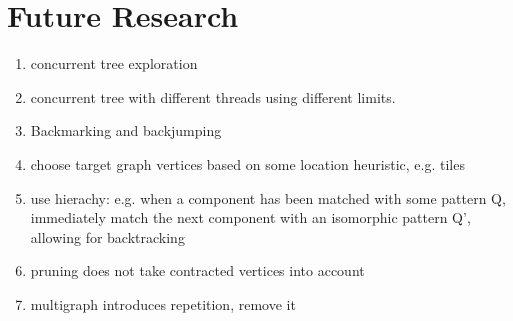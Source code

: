 \chapter{Future Research}

\begin{enumerate}
\item concurrent tree exploration
\item concurrent tree with different threads using different limits.
\item Backmarking and backjumping
\item choose target graph vertices based on some location heuristic, e.g. tiles
\item use hierachy: e.g. when a component has been matched with some pattern Q, immediately match the next component with an isomorphic pattern Q', allowing for backtracking
\item pruning does not take contracted vertices into account
\item multigraph introduces repetition, remove it


\end{enumerate}